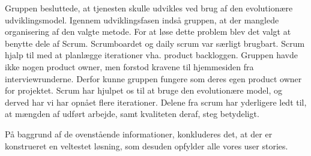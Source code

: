 Gruppen besluttede, at tjenesten skulle udvikles ved brug af den evolutionære udviklingsmodel. 
Igennem udviklingsfasen indså gruppen, at der manglede organisering af den valgte metode. 
For at løse dette problem blev det valgt at benytte dele af Scrum. 
Scrumboardet og daily scrum var særligt brugbart. 
Scrum hjalp til med at planlægge iterationer vha. product backloggen.
Gruppen havde ikke nogen product owner, men forstod kravene til hjemmesiden fra interviewrunderne.
Derfor kunne gruppen fungere som deres egen product owner for projektet. 
Scrum har hjulpet os til at bruge den evolutionære model, og derved har vi har opnået flere iterationer. 
Delene fra scrum har yderligere ledt til, at mængden af udført arbejde, samt kvaliteten deraf, steg betydeligt.

På baggrund af de ovenstående informationer, konkluderes det, at der er konstrueret en veltestet løsning, som desuden  opfylder alle vores user stories.

